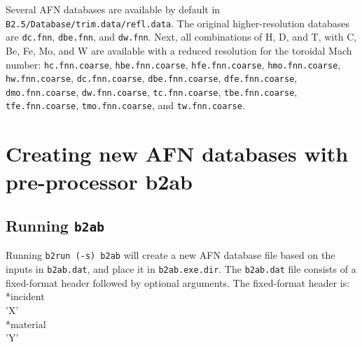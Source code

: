 Several AFN databases are available by default in {\tt B2.5/Database/trim.data/refl.data}. The original higher-resolution databases are {\tt dc.fnn}, {\tt dbe.fnn}, and {\tt dw.fnn}. Next, all combinations of H, D, and T, with C, Be, Fe, Mo, and W are available with a reduced resolution for the toroidal Mach number: {\tt hc.fnn.coarse}, {\tt hbe.fnn.coarse}, {\tt hfe.fnn.coarse}, {\tt hmo.fnn.coarse}, {\tt hw.fnn.coarse}, {\tt dc.fnn.coarse}, {\tt dbe.fnn.coarse}, {\tt dfe.fnn.coarse}, {\tt dmo.fnn.coarse}, {\tt dw.fnn.coarse}, {\tt tc.fnn.coarse}, {\tt tbe.fnn.coarse}, {\tt tfe.fnn.coarse}, {\tt tmo.fnn.coarse}, and {\tt tw.fnn.coarse}.

\section{Creating new AFN databases with pre-processor b2ab}

\subsection{Running {\tt b2ab}}

Running {\tt b2run (-s) b2ab} will create a new AFN database file based on the inputs in {\tt b2ab.dat}, and place it in {\tt b2ab.exe.dir}. The {\tt b2ab.dat} file consists of a fixed-format header followed by optional arguments. The fixed-format header is: \newline
\\
*incident \\
\hspace{2cm} 'X' \\
*material \\
\hspace{2cm} 'Y' \\


